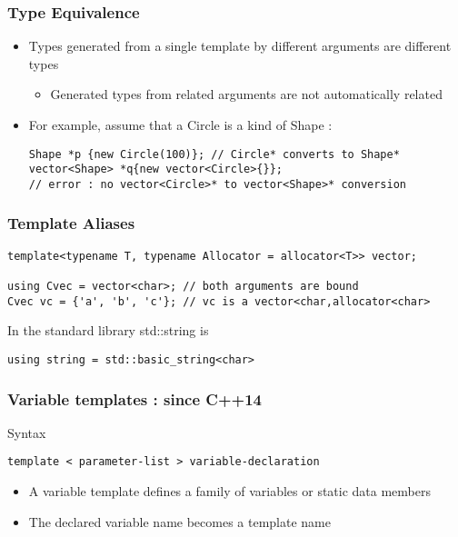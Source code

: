 \documentclass{beamer}
\begin{document}
\begin{frame}[fragile]
\frametitle{Type Equivalence}

\begin{itemize}
\item Types generated from a single template by different arguments are different types
    \begin{itemize} 
    \item Generated types from related arguments are not automatically related
    \end{itemize}

\item For example, assume that a Circle is a kind of Shape :
\begin{lstlisting}
Shape *p {new Circle(100)}; // Circle* converts to Shape*
vector<Shape> *q{new vector<Circle>{}}; 
// error : no vector<Circle>* to vector<Shape>* conversion
\end{lstlisting}
\end{itemize}

\end{frame}


\begin{frame}[fragile]
\frametitle{Template Aliases}

\begin{lstlisting}
template<typename T, typename Allocator = allocator<T>> vector;

using Cvec = vector<char>; // both arguments are bound
Cvec vc = {'a', 'b', 'c'}; // vc is a vector<char,allocator<char>
\end{lstlisting}

\begin{block} {In the standard library std::string is}
\begin{lstlisting}
using string = std::basic_string<char>
\end{lstlisting}
\end{block}

\end{frame}

\begin{frame}[fragile]
\frametitle{Variable templates : since C++14}
\begin{block} {Syntax}
\begin{lstlisting}
template < parameter-list > variable-declaration
\end{lstlisting}
\end{block}
\begin{itemize}
\item A variable template defines a family of variables or static data members
\item The declared variable name becomes a template name
\end{itemize}
\end{frame}
\end{document}
